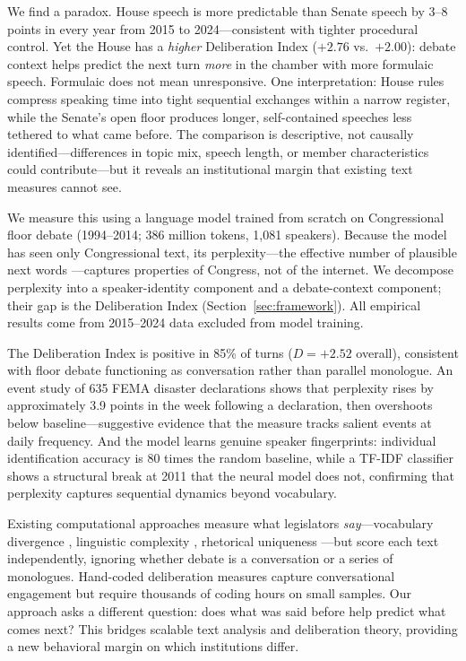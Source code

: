 \documentclass[12pt]{article}
\newcommand{\DI}{\mathit{D}}
\begin{document}
We find a paradox. House speech is more predictable than Senate speech by 3--8 points in every year from 2015 to 2024---consistent with tighter procedural control. Yet the House has a \textit{higher} Deliberation Index ($+2.76$ vs.\ $+2.00$): debate context helps predict the next turn \textit{more} in the chamber with more formulaic speech. Formulaic does not mean unresponsive. One interpretation: House rules compress speaking time into tight sequential exchanges within a narrow register, while the Senate's open floor produces longer, self-contained speeches less tethered to what came before. The comparison is descriptive, not causally identified---differences in topic mix, speech length, or member characteristics could contribute---but it reveals an institutional margin that existing text measures cannot see.

We measure this using a language model trained from scratch on Congressional floor debate (1994--2014; 386 million tokens, 1,081 speakers). Because the model has seen only Congressional text, its perplexity---the effective number of plausible next words \citep{shannon1948}---captures properties of Congress, not of the internet. We decompose perplexity into a speaker-identity component and a debate-context component; their gap is the Deliberation Index (Section~\ref{sec:framework}). All empirical results come from 2015--2024 data excluded from model training.

The Deliberation Index is positive in 85\% of turns ($\DI = +2.52$ overall), consistent with floor debate functioning as conversation rather than parallel monologue. An event study of 635 FEMA disaster declarations shows that perplexity rises by approximately 3.9 points in the week following a declaration, then overshoots below baseline---suggestive evidence that the measure tracks salient events at daily frequency. And the model learns genuine speaker fingerprints: individual identification accuracy is 80 times the random baseline, while a TF-IDF classifier shows a structural break at 2011 that the neural model does not, confirming that perplexity captures sequential dynamics beyond vocabulary.

Existing computational approaches measure what legislators \textit{say}---vocabulary divergence \citep{gentzkow2019}, linguistic complexity \citep{spirling2016}, rhetorical uniqueness \citep{zhou2024}---but score each text independently, ignoring whether debate is a conversation or a series of monologues. Hand-coded deliberation measures \citep{steiner2004, bachtiger2019} capture conversational engagement but require thousands of coding hours on small samples. Our approach asks a different question: does what was said before help predict what comes next? This bridges scalable text analysis and deliberation theory, providing a new behavioral margin on which institutions differ.
\end{document}
